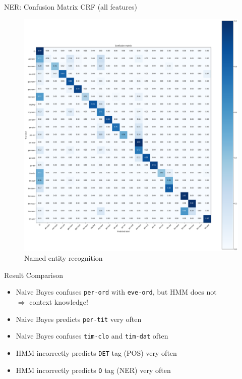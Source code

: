 \begin{frame}{NER: Confusion Matrix CRF (all features)}{}
	\begin{figure}
		\includegraphics[scale=0.1]{img/cm_ner}
		\caption{Named entity recognition}
	\end{figure}
\end{frame}


\begin{frame}{Result Comparison}{}
	\begin{itemize}
		\item Naive Bayes confuses \texttt{per-ord} with \texttt{eve-ord}, but HMM does not \\
			$\Rightarrow$ context knowledge!
		\item Naive Bayes predicts \texttt{per-tit} very often
		\item Naive Bayes confuses \texttt{tim-clo} and \texttt{tim-dat} often
		\item HMM incorrectly predicts \texttt{DET} tag (POS) very often
		\item HMM incorrectly predicts \texttt{O} tag (NER) very often
	\end{itemize}
\end{frame}


